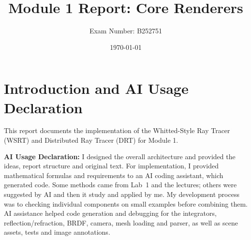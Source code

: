 \documentclass[11pt,a4paper]{article}
\title{Module 1 Report: Core Renderers}
\author{Exam Number: B252751}
\date{\today}
\begin{document}
\maketitle

\section{Introduction and AI Usage Declaration}
This report documents the implementation of the Whitted-Style Ray Tracer (WSRT) and Distributed Ray Tracer (DRT) for Module 1.

\textbf{AI Usage Declaration:} I designed the overall architecture and provided the ideas, report structure and original text. For implementation, I provided mathematical formulas and requirements to an AI coding assistant, which generated code. Some methods came from Lab~1 and the lectures; others were suggested by AI and then it study and applied by me. My development process was to checking individual components on small examples before combining them. AI assistance helped code generation and debugging for the integrators, reflection/refraction, BRDF, camera, mesh loading and parser, as well as scene assets, tests and image annotations.
\end{document}
